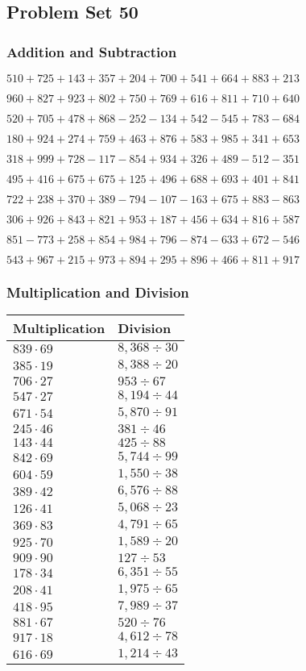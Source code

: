 \hypertarget{problem-set-50-1}{%
\subsection{Problem Set 50}\label{problem-set-50-1}}

\hypertarget{addition-and-subtraction-150}{%
\subsubsection{Addition and
Subtraction}\label{addition-and-subtraction-150}}

\(510 + 725 + 143 + 357 + 204 + 700 + 541 + 664 + 883 + 213\)

\(960 + 827 + 923 + 802 + 750 + 769 + 616 + 811 + 710 + 640\)

\(520 + 705 + 478 + 868 - 252 - 134 + 542 - 545 + 783 - 684\)

\(180 + 924 + 274 + 759 + 463 + 876 + 583 + 985 + 341 + 653\)

\(318 + 999 + 728 - 117 - 854 + 934 + 326 + 489 - 512 - 351\)

\(495 + 416 + 675 + 675 + 125 + 496 + 688 + 693 + 401 + 841\)

\(722 + 238 + 370 + 389 - 794 - 107 - 163 + 675 + 883 - 863\)

\(306 + 926 + 843 + 821 + 953 + 187 + 456 + 634 + 816 + 587\)

\(851 - 773 + 258 + 854 + 984 + 796 - 874 - 633 + 672 - 546\)

\(543 + 967 + 215 + 973 + 894 + 295 + 896 + 466 + 811 + 917\)

\hypertarget{multiplication-and-division-150}{%
\subsubsection{Multiplication and
Division}\label{multiplication-and-division-150}}

\begin{longtable}[]{@{}ll@{}}
\toprule
Multiplication & Division\tabularnewline
\midrule
\endhead
\(839 \cdot 69\) & \(8,368÷30\)\tabularnewline
\(385 \cdot 19\) & \(8,388÷20\)\tabularnewline
\(706 \cdot 27\) & \(953÷67\)\tabularnewline
\(547 \cdot 27\) & \(8,194÷44\)\tabularnewline
\(671 \cdot 54\) & \(5,870÷91\)\tabularnewline
\(245 \cdot 46\) & \(381÷46\)\tabularnewline
\(143 \cdot 44\) & \(425÷88\)\tabularnewline
\(842 \cdot 69\) & \(5,744÷99\)\tabularnewline
\(604 \cdot 59\) & \(1,550÷38\)\tabularnewline
\(389 \cdot 42\) & \(6,576÷88\)\tabularnewline
\(126 \cdot 41\) & \(5,068÷23\)\tabularnewline
\(369 \cdot 83\) & \(4,791÷65\)\tabularnewline
\(925 \cdot 70\) & \(1,589÷20\)\tabularnewline
\(909 \cdot 90\) & \(127÷53\)\tabularnewline
\(178 \cdot 34\) & \(6,351÷55\)\tabularnewline
\(208 \cdot 41\) & \(1,975÷65\)\tabularnewline
\(418 \cdot 95\) & \(7,989÷37\)\tabularnewline
\(881 \cdot 67\) & \(520÷76\)\tabularnewline
\(917 \cdot 18\) & \(4,612÷78\)\tabularnewline
\(616 \cdot 69\) & \(1,214÷43\)\tabularnewline
\bottomrule
\end{longtable}

